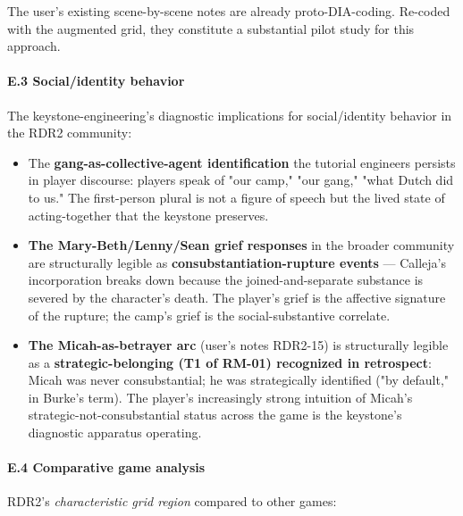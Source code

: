 \documentclass[11pt]{report}
\begin{document}
The user's existing scene-by-scene notes are already proto-DIA-coding. Re-coded with the augmented grid, they constitute a substantial pilot study for this approach.


\paragraph{E.3 Social/identity behavior}


The keystone-engineering's diagnostic implications for social/identity behavior in the RDR2 community:


\begin{itemize}
\item The \textbf{gang-as-collective-agent identification} the tutorial engineers persists in player discourse: players speak of "our camp," "our gang," "what Dutch did to us." The first-person plural is not a figure of speech but the lived state of acting-together that the keystone preserves.
\item \textbf{The Mary-Beth/Lenny/Sean grief responses} in the broader community are structurally legible as \textbf{consubstantiation-rupture events} — Calleja's incorporation breaks down because the joined-and-separate substance is severed by the character's death. The player's grief is the affective signature of the rupture; the camp's grief is the social-substantive correlate.
\item \textbf{The Micah-as-betrayer arc} (user's notes RDR2-15) is structurally legible as a \textbf{strategic-belonging (T1 of RM-01) recognized in retrospect}: Micah was never consubstantial; he was strategically identified ("by default," in Burke's term). The player's increasingly strong intuition of Micah's strategic-not-consubstantial status across the game is the keystone's diagnostic apparatus operating.
\end{itemize}


\paragraph{E.4 Comparative game analysis}


RDR2's \textit{characteristic grid region} compared to other games:
\end{document}
